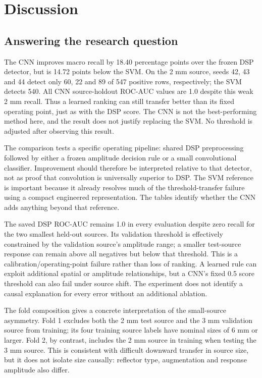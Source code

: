 \documentclass[11pt,a4paper]{article}
\begin{document}
\FloatBarrier
\section{Discussion}

\subsection{Answering the research question}

The CNN improves macro recall by 18.40 percentage points over the frozen DSP detector, but is 14.72 points below the SVM. On the 2 mm source, seeds 42, 43 and 44 detect only 60, 22 and 89 of 547 positive rows, respectively; the SVM detects 540. All CNN source-holdout ROC-AUC values are 1.0 despite this weak 2 mm recall. Thus a learned ranking can still transfer better than its fixed operating point, just as with the DSP score. The CNN is not the best-performing method here, and the result does not justify replacing the SVM. No threshold is adjusted after observing this result.

The comparison tests a specific operating pipeline: shared DSP preprocessing followed by either a frozen amplitude decision rule or a small convolutional classifier. Improvement should therefore be interpreted relative to that detector, not as proof that convolution is universally superior to DSP. The SVM reference is important because it already resolves much of the threshold-transfer failure using a compact engineered representation. The tables identify whether the CNN adds anything beyond that reference.

The saved DSP ROC-AUC remains 1.0 in every evaluation despite zero recall for the two smallest held-out sources. Its validation threshold is effectively constrained by the validation source's amplitude range; a smaller test-source response can remain above all negatives but below that threshold. This is a calibration/operating-point failure rather than loss of ranking. A learned rule can exploit additional spatial or amplitude relationships, but a CNN's fixed 0.5 score threshold can also fail under source shift. The experiment does not identify a causal explanation for every error without an additional ablation.

The fold composition gives a concrete interpretation of the small-source asymmetry. Fold 1 excludes both the 2 mm test source and the 3 mm validation source from training; its four training source labels have nominal sizes of 6 mm or larger. Fold 2, by contrast, includes the 2 mm source in training when testing the 3 mm source. This is consistent with difficult downward transfer in source size, but it does not isolate size causally: reflector type, augmentation and response amplitude also differ.
\end{document}
